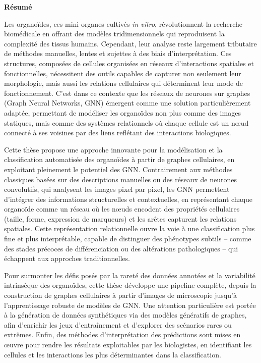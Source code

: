 
\clearpage
\thispagestyle{empty}
\vspace*{-2cm}

\begin{center}
{\large\bfseries Résumé}\par
\vspace{0.4cm}
\end{center}

Les organoïdes, ces mini-organes cultivés \textit{in vitro}, révolutionnent la recherche biomédicale en offrant des modèles tridimensionnels qui reproduisent la complexité des tissus humains. Cependant, leur analyse reste largement tributaire de méthodes manuelles, lentes et sujettes à des biais d'interprétation. Ces structures, composées de cellules organisées en réseaux d'interactions spatiales et fonctionnelles, nécessitent des outils capables de capturer non seulement leur morphologie, mais aussi les relations cellulaires qui déterminent leur mode de fonctionnement. C'est dans ce contexte que les réseaux de neurones sur graphes (Graph Neural Networks, GNN) émergent comme une solution particulièrement adaptée, permettant de modéliser les organoïdes non plus comme des images statiques, mais comme des systèmes relationnels où chaque cellule est un nœud connecté à ses voisines par des liens reflétant des interactions biologiques.

Cette thèse propose une approche innovante pour la modélisation et la classification automatisée des organoïdes à partir de graphes cellulaires, en exploitant pleinement le potentiel des GNN. Contrairement aux méthodes classiques basées sur des descriptions manuelles ou des réseaux de neurones convolutifs, qui analysent les images pixel par pixel, les GNN permettent d'intégrer des informations structurelles et contextuelles, en représentant chaque organoïde comme un réseau où les nœuds encodent des propriétés cellulaires (taille, forme, expression de marqueurs) et les arêtes capturent les relations spatiales. Cette représentation relationnelle ouvre la voie à une classification plus fine et plus interprétable, capable de distinguer des phénotypes subtils – comme des stades précoces de différenciation ou des altérations pathologiques – qui échappent aux approches traditionnelles.

Pour surmonter les défis posés par la rareté des données annotées et la variabilité intrinsèque des organoïdes, cette thèse développe une pipeline complète, depuis la construction de graphes cellulaires à partir d'images de microscopie jusqu'à l'apprentissage robuste de modèles de GNN. Une attention particulière est portée à la génération de données synthétiques via des modèles génératifs de graphes, afin d'enrichir les jeux d'entraînement et d'explorer des scénarios rares ou extrêmes. Enfin, des méthodes d'interprétation des prédictions sont mises en œuvre pour rendre les résultats exploitables par les biologistes, en identifiant les cellules et les interactions les plus déterminantes dans la classification.

